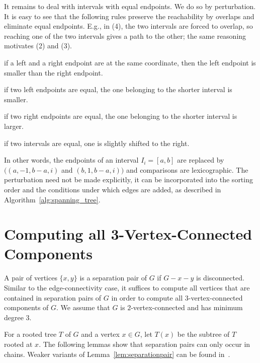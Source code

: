 \documentclass[paper=a4]{scrartcl}
\begin{document}
It remains to deal with intervals with equal endpoints. We do so by perturbation. It is easy to see that the following rules preserve the reachability by overlaps and eliminate equal endpoints. E.g., in (4), the two intervals are forced to overlap, so reaching one of the two intervals gives a path to the other; the same reasoning motivates (2) and (3).
\begin{compactenum}[(1)]
\item if a left and a right endpoint are at the same coordinate, then the left endpoint is smaller than the right endpoint.
\item if two left endpoints are equal, the one belonging to the shorter interval is smaller.
\item if two right endpoints are equal, the one belonging to the shorter interval is larger.
\item if two intervals are equal, one is slightly shifted to the right.
\end{compactenum}
In other words, the endpoints of an interval $I_i=[a,b]$ are replaced by $((a,-1,b-a,i)$ and $(b,1,b-a,i))$ and comparisons are lexicographic. The perturbation need not be made explicitly, it can be incorporated into the sorting order and the conditions under which edges are added, as described in Algorithm~\ref{alg:spanning_tree}.



\section{Computing all 3-Vertex-Connected Components}\label{3-Vertex Components}

A pair of vertices $\{x,y\}$ is a separation pair of $G$ if $G - x - y$ is disconnected. Similar to the edge-connectivity case, it suffices to compute all vertices that are contained in separation pairs of $G$ in order to compute all $3$-vertex-connected components of $G$. We assume that $G$ is $2$-vertex-connected and has minimum degree $3$.

For a rooted tree $T$ of $G$ and a vertex $x \in G$, let $T(x)$ be the subtree of $T$ rooted at $x$. The following lemmas show that separation pairs can only occur in chains. Weaker variants of Lemma~\ref{lem:separationpair} can be found in~\cite{Hopcroft1973,Vo1983,Vo1983a}.
\end{document}
